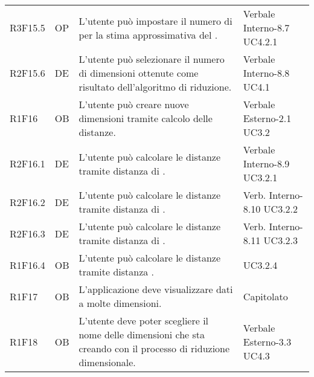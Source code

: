 {\begin{longtable}{C{2cm} | C{1.5cm} | C{9cm} | C{3.3cm}}
R3F15.5 & OP & L'utente può impostare il numero di  per la stima approssimativa del . & Verbale Interno-8.7 \newline UC4.2.1\\
R2F15.6 & DE & L'utente può selezionare il numero di dimensioni ottenute come risultato dell'algoritmo di riduzione. & Verbale Interno-8.8 \newline UC4.1\\
R1F16 & OB & L'utente può creare nuove dimensioni tramite calcolo delle distanze. & Verbale Esterno-2.1 \newline UC3.2\\ 
R2F16.1 & DE & L'utente può calcolare le distanze tramite distanza di . &  Verbale Interno-8.9 \newline UC3.2.1\\
R2F16.2 & DE & L'utente può calcolare le distanze tramite distanza di . & Verb. Interno-8.10 \newline UC3.2.2 \\
R2F16.3 & DE & L'utente può calcolare le distanze tramite distanza di . &  Verb. Interno-8.11 \newline UC3.2.3\\
R1F16.4 & OB & L'utente può calcolare le distanze tramite distanza . &  UC3.2.4\\
R1F17 & OB & L'applicazione deve visualizzare dati a molte dimensioni. & Capitolato\\
R1F18 & OB & L'utente deve poter scegliere il nome delle dimensioni che sta creando con il processo di riduzione dimensionale. & Verbale Esterno-3.3 \newline UC4.3\\

\end{longtable}
}







